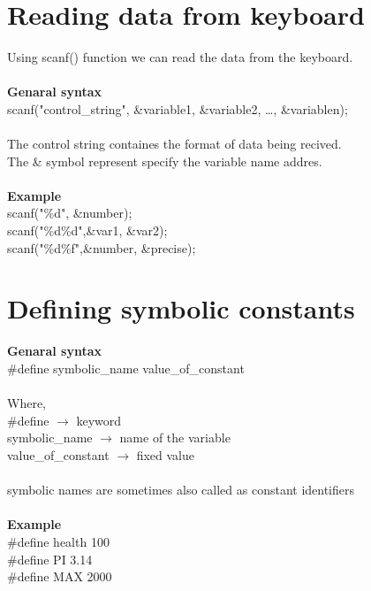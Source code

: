 \documentclass{article}
\begin{document}
	\section{Reading data from keyboard}
	Using scanf() function we can read the data from the keyboard.
	\\ \\
	\textbf{Genaral syntax} \\
	scanf("control\_string", \&variable1, \&variable2, \dots , \&variablen); 
	\\ \\
	The control string containes the format of data being recived. \\
	The \& symbol represent specify the variable name addres. 
	\\ \\
	\textbf{Example} \\
	scanf("\%d", \&number); \\
	scanf("\%d\%d",\&var1, \&var2); \\
	scanf("\%d\%f",\&number, \&precise);
	
	\section{Defining symbolic constants}
	\textbf{Genaral syntax} \\
	\#define symbolic\_name value\_of\_constant
	\\ \\
	Where, \\
	\tab \tab \#define $\rightarrow$ keyword \\
	\tab \tab symbolic\_name $\rightarrow$ name of the variable \\
	\tab \tab value\_of\_constant $\rightarrow$ fixed value
	\\ \\
	symbolic names are sometimes also called as constant identifiers 
	\\ \\
	\textbf{Example} \\
	\#define health 100 \\
	\#define PI 3.14 \\
	\#define MAX 2000
	
\end{document}
